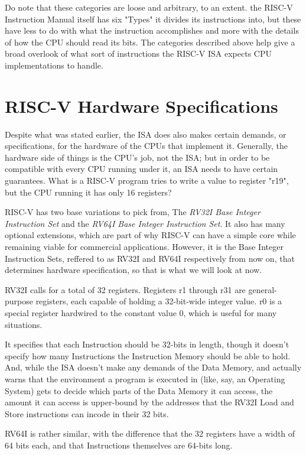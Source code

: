 \documentclass[12pt,twoside]{reedthesis}
\begin{document}
Do note that these categories are loose and arbitrary, to an extent. the RISC-V Instruction Manual itself has six "Types" it divides its instructions into, but these have less to do with what the instruction accomplishes and more with the details of how the CPU should read its bits. The categories described above help give a broad overlook of what sort of instructions the RISC-V ISA expects CPU implementations to handle.

\section{RISC-V Hardware Specifications}

Despite what was stated earlier, the ISA  does also makes certain demands, or specifications, for the hardware of the CPUs that implement it. Generally, the hardware side of things is the CPU's job, not the ISA; but in order to be compatible with every CPU running under it, an ISA needs to have certain guarantees. What is a RISC-V program tries to write a value to register "r19", but the CPU running it has only 16 registers?

RISC-V has two base variations to pick from, The \textit{RV32I Base Integer Instruction Set} and the \textit{RV64I Base Integer Instruction Set}. It also has many optional extensions, which are part of why RISC-V can have a simple core while remaining viable for commercial applications. However, it is the Base Integer Instruction Sets, reffered to as RV32I and RV64I respectively from now on, that determines hardware specification, so that is what we will look at now.

RV32I calls for a total of 32 registers. Registers r1 through r31 are general-purpose registers, each capable of holding a 32-bit-wide integer value. r0 is a special register hardwired to the constant value 0, which is useful for many situations.

It specifies that each Instruction should be 32-bits in length, though it doesn't specify how many Instructions the Instruction Memory should be able to hold. And, while the ISA doesn't make any demands of the Data Memory, and actually warns that the environment a program is executed in (like, say, an Operating System) gets to decide which parts of the Data Memory it can access, the amount it can access is upper-bound by the addresses that the RV32I Load and Store instructions can incode in their 32 bits.

RV64I is rather similar, with the difference that the 32 registers have a width of 64 bits each, and that Instructions themselves are 64-bits long.
\end{document}
